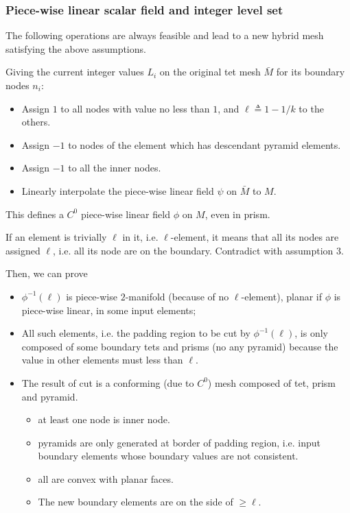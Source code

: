 \documentclass[9pt]{extarticle}
\begin{document}
\subsubsection{Piece-wise linear scalar field and integer level set}
The following operations are always feasible and lead to a new hybrid
mesh satisfying the above assumptions.

Giving the current integer values $L_i$ on the original tet mesh
$\bar{M}$ for its boundary nodes $n_i$:
\begin{itemize}
\item Assign $1$ to all nodes with value no less than
  $1$, and $\ell \triangleq 1-1/k$ to the others.
\item Assign $-1$ to nodes of the element which has descendant pyramid
  elements.
\item Assign $-1$ to all the inner nodes.
\item Linearly interpolate the piece-wise linear field $\psi$ on $\bar{M}$ to
  $M$.
\end{itemize}
This defines a $C^0$ piece-wise linear field $\phi$ on $M$, even in prism.

If an element is trivially $\ell$ in it, i.e. $\ell$-element, it means that
all its nodes are assigned $\ell$, i.e. all its node are on the boundary.
Contradict with assumption 3.

Then, we can prove
\begin{itemize}
  \item $\phi^{-1}(\ell)$ is piece-wise $2$-manifold (because of no
    $\ell$-element), planar if $\phi$ is piece-wise linear, in some
    input elements;
  \item All such elements, i.e. the padding region to be cut by
    $\phi^{-1}(\ell)$, is only composed of some boundary tets and
    prisms (no any pyramid) because the value in other elements
    must less than $\ell$.
  \item The result of cut is a conforming (due to $C^0$) mesh composed
    of tet, prism and pyramid.
    \begin{itemize}
      \item at least one node is inner node.
      \item pyramids are only generated at border of padding region,
        i.e. input boundary elements whose boundary values are not
        consistent.
      \item all are convex with planar faces.
      \item The new boundary elements are on the side of $\geq \ell$.
    \end{itemize}
\end{itemize}
\end{document}

